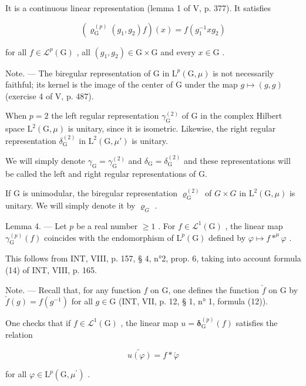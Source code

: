 It is a continuous linear representation (lemma 1 of V, p. 377). It satisfies

\[
(\boldsymbol {\varrho} _ {\mathrm{G}} ^ {(p)} (g _ {1}, g _ {2}) f) (x) = f (g _ {1} ^ {- 1} x g _ {2})
\]

for all \(f \in \mathcal{L}^p(\mathrm{G})\) , all \((g_1, g_2) \in \mathrm{G} \times \mathrm{G}\) and every \(x \in \mathrm{G}\) .

Note. --- The biregular representation of G in \(\mathrm{L}^{p}(\mathrm{G},\mu)\) is not necessarily faithful; its kernel is the image of the center of G under the map \(g\mapsto(g,g)\) (exercise 4 of V, p. 487).

When \(p = 2\) the left regular representation \(\gamma_{\mathrm{G}}^{(2)}\) of G in the complex Hilbert space \(\mathrm{L}^2 (\mathrm{G},\mu)\) is unitary, since it is isometric. Likewise, the right regular representation \(\delta_{\mathrm{G}}^{(2)}\) in \(\mathrm{L}^2 (\mathrm{G},\mu')\) is unitary.

We will simply denote \(\gamma_{\mathrm{G}} = \gamma_{\mathrm{G}}^{(2)}\) and \(\delta_{\mathrm{G}} = \delta_{\mathrm{G}}^{(2)}\) and these representations will be called the left and right regular representations of G.

If G is unimodular, the biregular representation \(\varrho_{\mathrm{G}}^{(2)}\) of \(G \times G\) in \(\mathrm{L}^{2}(\mathrm{G}, \mu)\) is unitary. We will simply denote it by \(\varrho_{G}\) .

Lemma 4. --- Let \(p\) be a real number \(\geqslant 1\) . For \(f \in \mathcal{L}^1(\mathrm{G})\) , the linear map \(\gamma_{\mathrm{G}}^{(p)}(f)\) coincides with the endomorphism of \(\mathrm{L}^p(\mathrm{G})\) defined by \(\varphi \mapsto f *^\mu \varphi\) .

This follows from INT, VIII, p. 157, § 4, n°2, prop. 6, taking into account formula (14) of INT, VIII, p. 165.

Note. --- Recall that, for any function \(f\) on G, one defines the function \(\check{f}\) on G by \(\check{f}(g) = f(g^{-1})\) for all \(g \in \mathrm{G}\) (INT, VII, p. 12, § 1, n° 1, formula (12)).

One checks that if \(f \in \mathcal{L}^{1}(\mathrm{G})\) , the linear map \(u = \boldsymbol{\delta}_{\mathrm{G}}^{(p)}(f)\) satisfies the relation

\[
\widetilde {u (\varphi)} = f * \check {\varphi}
\]

for all \(\varphi\in\mathrm{L}^{p}(\mathrm{G},\mu^{\prime})\) .